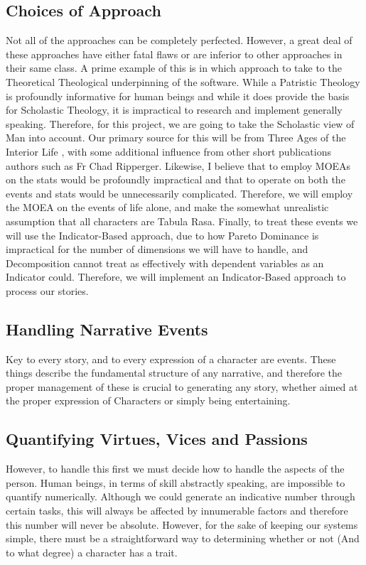 \documentclass[12pt]{article}
\begin{document}
\subsection{Choices of Approach}
Not all of the approaches can be completely perfected. However, a great deal of these approaches have either fatal flaws or are inferior to other approaches in their same class. A prime example of this is in which approach to take to the Theoretical Theological underpinning of the software. While a Patristic Theology is profoundly informative for human beings and while it does provide the basis for Scholastic Theology, it is impractical to research and implement generally speaking. Therefore, for this project, we are going to take the Scholastic view of Man into account. Our primary source for this will be from Three Ages of the Interior Life \cite{garrigou2013three}, with some additional influence from other short publications authors such as Fr Chad Ripperger. Likewise, I believe that to employ MOEAs on the stats would be profoundly impractical and that to operate on both the events and stats would be unnecessarily complicated. Therefore, we will employ the MOEA on the events of life alone, and make the somewhat unrealistic assumption that all characters are Tabula Rasa. Finally, to treat these events we will use the Indicator-Based approach, due to how Pareto Dominance is impractical for the number of dimensions we will have to handle, and Decomposition cannot treat as effectively with dependent variables as an Indicator could. Therefore, we will implement an Indicator-Based approach to process our stories. 

\subsection{Handling Narrative Events}
Key to every story, and to every expression of a character are events. These things describe the fundamental structure of any narrative, and therefore the proper management of these is crucial to generating any story, whether aimed at the proper expression of Characters or simply being entertaining. 

\subsection{Quantifying Virtues, Vices and Passions}
However, to handle this first we must decide how to handle the aspects of the person. Human beings, in terms of skill abstractly speaking, are impossible to quantify numerically. Although we could generate an indicative number through certain tasks, this will always be affected by innumerable factors and therefore this number will never be absolute. However, for the sake of keeping our systems simple, there must be a straightforward way to determining whether or not (And to what degree) a character has a trait. \\
\end{document}
